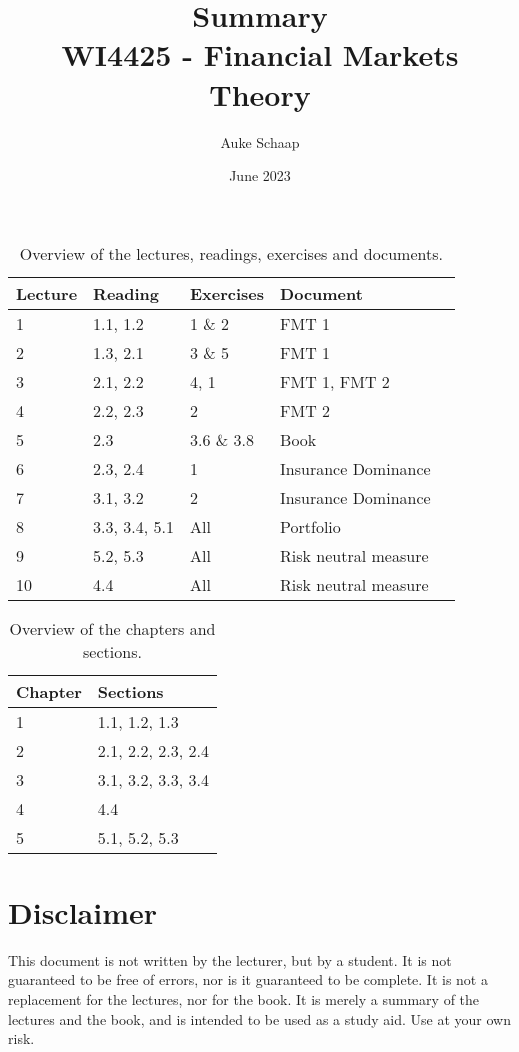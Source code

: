 \documentclass[twoside, titlepage]{article}
\title{%
    Summary \\
    \large WI4425 - Financial Markets Theory
}
\author{Auke Schaap}
\date{June 2023}
\begin{document}
\maketitle

\newpage

\thispagestyle{empty}
\begin{table}
    \centering
    \begin{tabular}{l|llll}
    Lecture &  Reading  &       Exercises & Document \\
    \hline
    1 &        1.1, 1.2 &       1 \& 2 & FMT 1 \\
    2 &        1.3, 2.1 &       3 \& 5 & FMT 1 \\
    3 &        2.1, 2.2 &       4, 1 & FMT 1, FMT 2 \\
    4 &        2.2, 2.3 &       2 & FMT 2 \\
    5 &        2.3 &            3.6 \& 3.8 & Book \\
    6 &        2.3, 2.4 &       1 & Insurance Dominance \\
    7 &        3.1, 3.2 &       2 & Insurance Dominance \\
    8 &        3.3, 3.4, 5.1 &  All & Portfolio \\
    9 &        5.2, 5.3 &       All & Risk neutral measure \\
    10&        4.4 &            All & Risk neutral measure
    \end{tabular}
    \caption{Overview of the lectures, readings, exercises and documents.}
\end{table}

\begin{table}
    \centering
    \begin{tabular}{l|l}
    Chapter & Sections \\
    \hline
    1 & 1.1, 1.2, 1.3 \\
    2 & 2.1, 2.2, 2.3, 2.4 \\
    3 & 3.1, 3.2, 3.3, 3.4 \\
    4 & 4.4 \\
    5 & 5.1, 5.2, 5.3
    \end{tabular}
    \caption{Overview of the chapters and sections.}
\end{table}
\clearpage

\thispagestyle{empty}

\vspace*{\fill}
\section*{Disclaimer}
This document is not written by the lecturer, but by a student. It is not guaranteed to be free of errors, nor is it guaranteed to be complete. It is not a replacement for the lectures, nor for the book. It is merely a summary of the lectures and the book, and is intended to be used as a study aid. Use at your own risk.
\end{document}
